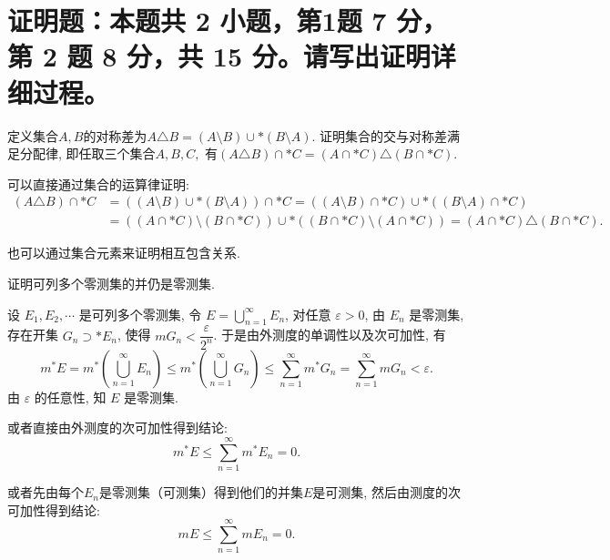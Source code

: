 \fi


\section{%
  证明题：本题共 2 小题，第1题 7 分，第 2 题 8 分，共 15 分。请写出证明详细过程。
}


\begin{question}[points = 7]
  定义集合$A, B$的对称差为$A \triangle B = (A \setminus B) \cup* (B \setminus A).$ 证明集合的交与对称差满足分配律, 即任取三个集合$A, B, C,$ 有$(A \triangle B) \cap* C = (A \cap* C) \triangle (B \cap* C).$
\end{question}

\begin{solution}
  可以直接通过集合的运算律证明:
  \[\begin{aligned}
  (A \triangle B) \cap* C & = ((A \setminus B) \cup* (B \setminus A)) \cap* C = ((A \setminus B) \cap* C) \cup* ((B \setminus A) \cap* C) \\
  & = ((A \cap* C) \setminus (B \cap* C)) \cup* ((B \cap* C) \setminus (A \cap* C)) = (A \cap* C) \triangle (B \cap* C).
  \end{aligned}\]

  也可以通过集合元素来证明相互包含关系.
\end{solution}

\begin{question}[points = 8]
  证明可列多个零测集的并仍是零测集.
\end{question}

\begin{solution}
  设 \(E_1, E_2, \cdots\) 是可列多个零测集, 令 \(E = \bigcup\limits_{n=1}^{\infty} E_n\), 对任意 \(\varepsilon > 0\), 由 \(E_n\) 是零测集, 存在开集 \(G_n \supset* E_n\), 使得 \(m G_n < \dfrac{\varepsilon}{2^n}\). 于是由外测度的单调性以及次可加性, 有
  \[m^* E = m^* \left( \bigcup\limits_{n=1}^{\infty} E_n \right) \leqslant m^* \left( \bigcup\limits_{n=1}^{\infty} G_n \right) \leqslant \sum\limits_{n=1}^{\infty} m^* G_n = \sum\limits_{n=1}^{\infty} m G_n < \varepsilon.\]
  由 \(\varepsilon\) 的任意性, 知 \(E\) 是零测集.

  或者直接由外测度的次可加性得到结论:
  \[m^* E \leqslant \sum\limits_{n=1}^{\infty} m^* E_n = 0.\]

  或者先由每个\(E_n\)是零测集（可测集）得到他们的并集\(E\)是可测集, 然后由测度的次可加性得到结论:
  \[m E \leqslant \sum\limits_{n=1}^{\infty} m E_n = 0.\]
\end{solution}


